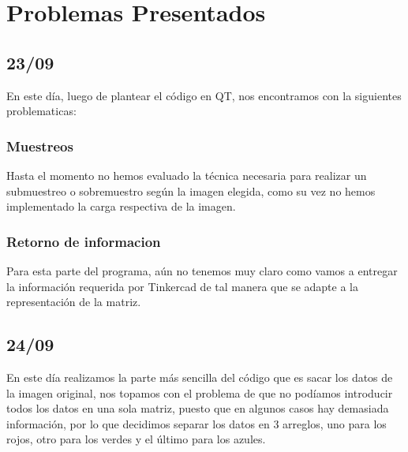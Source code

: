 \documentclass{article}
\begin{document}
\section{Problemas Presentados}
\label{problemas}
    \begin{flushleft}
     \subsection{23/09}
     En este día, luego de plantear el código en QT, nos encontramos con la siguientes problematicas:
    \end{flushleft}
    
    \begin{flushleft}
    \subsubsection{Muestreos}
    Hasta el momento no hemos evaluado la técnica necesaria para realizar un submuestreo o sobremuestro según la imagen elegida, como su vez no hemos implementado la carga respectiva de la imagen.  
    \end{flushleft}
    
    \begin{flushleft}
    \subsubsection{Retorno de informacion}
    Para esta parte del programa, aún no tenemos muy claro como vamos a entregar la información requerida por Tinkercad de tal manera que se adapte a la representación de la matriz.  
    \end{flushleft}
    
    \begin{flushleft}
     \subsection{24/09}
     En este día realizamos la parte más sencilla del código que es sacar los datos de la imagen original, nos topamos con el problema de que no podíamos introducir todos los datos en una sola matriz, puesto que en algunos casos hay demasiada información, por lo que decidimos separar los datos en 3 arreglos, uno para los rojos, otro para los verdes y el último para los azules.
    \end{flushleft}
    
\end{document}
